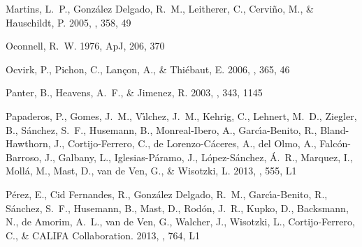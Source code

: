 \begin{thebibliography}
{Martins}, L.~P., {Gonz{\'a}lez Delgado}, R.~M., {Leitherer}, C.,
  {Cervi{\~n}o}, M., \& {Hauschildt}, P. 2005, \mnras, 358, 49


Oconnell, R.~W. 1976, ApJ, 206, 370
 \href{http://adsabs.harvard.edu/cgi-bin/nph-data_query?bibcode=1976ApJ...206.%
.370O&link_type=ABSTRACT}{\urllinklabel}

{Ocvirk}, P., {Pichon}, C., {Lan{\c c}on}, A., \& {Thi{\'e}baut}, E. 2006,
  \mnras, 365, 46


{Panter}, B., {Heavens}, A.~F., \& {Jimenez}, R. 2003, \mnras, 343, 1145


{Papaderos}, P., {Gomes}, J.~M., {V{\'{\i}}lchez}, J.~M., {Kehrig}, C.,
  {Lehnert}, M.~D., {Ziegler}, B., {S{\'a}nchez}, S.~F., {Husemann}, B.,
  {Monreal-Ibero}, A., {Garc{\'{\i}}a-Benito}, R., {Bland-Hawthorn}, J.,
  {Cortijo-Ferrero}, C., {de Lorenzo-C{\'a}ceres}, A., {del Olmo}, A.,
  {Falc{\'o}n-Barroso}, J., {Galbany}, L., {Iglesias-P{\'a}ramo}, J.,
  {L{\'o}pez-S{\'a}nchez}, {\'A}.~R., {Marquez}, I., {Moll{\'a}}, M., {Mast},
  D., {van de Ven}, G., \& {Wisotzki}, L. 2013, \aap, 555, L1


{P{\'e}rez}, E., {Cid Fernandes}, R., {Gonz{\'a}lez Delgado}, R.~M.,
  {Garc{\'{\i}}a-Benito}, R., {S{\'a}nchez}, S.~F., {Husemann}, B., {Mast}, D.,
  {Rod{\'o}n}, J.~R., {Kupko}, D., {Backsmann}, N., {de Amorim}, A.~L., {van de
  Ven}, G., {Walcher}, J., {Wisotzki}, L., {Cortijo-Ferrero}, C., \& {CALIFA
  Collaboration}. 2013, \apjl, 764, L1



\end{thebibliography}
